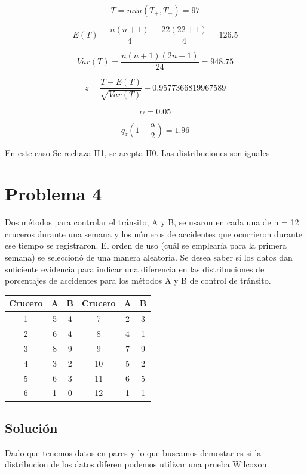 \documentclass{article}
\begin{document}
\[T = min(T_{+}, T_{-}) = 97\]

\[
    E(T) = \frac{n(n + 1)}{4} = \frac{22(22 + 1)}{4} = 126.5
\]

\[
    Var(T) = \frac{n(n + 1)(2n + 1)}{24} = 948.75
\]

\[
    z = \frac{T - E(T)}{\sqrt{Var(T)}} -0.9577366819967589
\]

\[\alpha = 0.05\]

\[q_z(1 - \frac{\alpha}{2}) = 1.96\]

En este caso Se rechaza H1, se acepta H0. Las distribuciones son iguales

\section{Problema 4}
Dos métodos para controlar el tránsito, A y B, se usaron en cada una de n = 12 cruceros durante una semana y los números de accidentes que ocurrieron durante ese tiempo se registraron. El orden de uso (cuál se emplearía para la primera semana) se seleccionó de una manera aleatoria. Se desea saber si los datos dan suficiente evidencia para indicar una diferencia en las distribuciones de porcentajes de accidentes para los métodos A y B de control de tránsito.

\begin{center}
    \begin{tabular}{c c c |c c c}
        Crucero & A & B & Crucero & A & B \\
        \hline
        1       & 5 & 4 & 7       & 2 & 3 \\
        2       & 6 & 4 & 8       & 4 & 1 \\
        3       & 8 & 9 & 9       & 7 & 9 \\
        4       & 3 & 2 & 10      & 5 & 2 \\
        5       & 6 & 3 & 11      & 6 & 5 \\
        6       & 1 & 0 & 12      & 1 & 1 \\
    \end{tabular}
\end{center}

\subsection*{Solución}
Dado que tenemos datos en pares y lo que buscamos demostar es si la distribucion de los datos diferen podemos utilizar una prueba Wilcoxon
\end{document}
